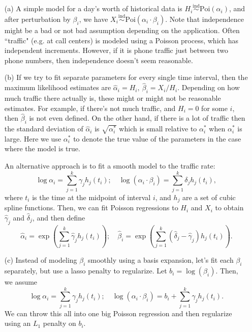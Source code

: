 \begin{enumerate}
\item[(a)] A simple model for a day's worth of historical data is $H_i \overset{\text{ind}}\sim \text{Poi}(\alpha_i)$, and after perturbation by $\beta_i$, we have $X_i \overset{\text{ind}}\sim \text{Poi}(\alpha_i \cdot \beta_i)$. Note that independence might be a bad or not bad assumption depending on the application. Often ``traffic" (e.g. at call centers) is modeled using a Poisson process, which has independent increments. However, if it is phone traffic just between two phone numbers, then independence doesn't seem reasonable.

\item[(b)] If we try to fit separate parameters for every single time interval, then the maximum likelihood estimates are $\hat \alpha_i = H_i, \ \hat \beta_i = X_i/H_i$. Depending on how much traffic there actually is, these might or might not be reasonable estimates. For example, if there's not much traffic, and $H_i = 0$ for some $i$, then $\hat \beta_i$ is not even defined. On the other hand, if there is a lot of traffic then the standard deviation of $\hat{\alpha}_i$ is $\sqrt{\alpha_i^*}$ which is small relative to $\alpha_i^*$ when $\alpha_i^*$ is large. Here we use $\alpha_i^*$ to denote the true value of the parameters in the case where the model is true.

An alternative approach is to fit a smooth model to the traffic rate:
\begin{equation*}
\log \alpha_i = \sum_{j = 1}^k \gamma_j h_j(t_i); \quad \log(\alpha_i \cdot \beta_i) = \sum_{j = 1}^k \delta_j h_j(t_i),
\end{equation*}
where $t_i$ is the time at the midpoint of interval $i$, and $h_j$ are a set of cubic spline functions. Then, we can fit Poisson regressions to $H_i$ and $X_i$ to obtain $\hat \gamma_j$ and $\hat \delta_j$, and then define
\begin{equation*}
\hat \alpha_i = \exp\left(\sum_{j = 1}^k \hat \gamma_j h_j(t_i)\right); \quad \hat \beta_i = \exp\left(\sum_{j = 1}^k (\hat \delta_j - \hat \gamma_j) h_j(t_i)\right).
\end{equation*}

\item[(c)] Instead of modeling $\beta_i$ smoothly using a basis expansion, let's fit each $\beta_i$ separately, but use a lasso penalty to regularize. Let $b_i = \log(\beta_i)$. Then, we assume
\begin{equation*}
\log \alpha_i = \sum_{j = 1}^k \gamma_j h_j(t_i); \quad \log (\alpha_i \cdot \beta_i) = b_i + \sum_{j = 1}^k \gamma_j h_j(t_i).
\end{equation*}
We can throw this all into one big Poisson regression and then regularize using an $L_1$ penalty on $b_i$.


\end{enumerate}

